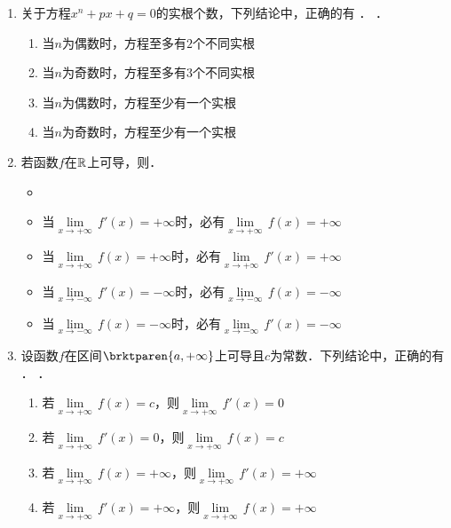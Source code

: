 \begin{enumerate}
\item 关于方程\(x^n + px + q = 0\)的实根个数，下列结论中，正确的有\ifshowsol
  \uline{}．
  \else
  \uline{\hspace{6em}}．
  \fi
  \begin{enumerate}
    \renewcommand{\labelenumii}{\enumparen{\arabic{enumii}}}
  \item 当\(n\)为偶数时，方程至多有\(2\)个不同实根
  \item 当\(n\)为奇数时，方程至多有\(3\)个不同实根
  \item 当\(n\)为偶数时，方程至少有一个实根
  \item 当\(n\)为奇数时，方程至少有一个实根
  \end{enumerate}

\item 若函数\(f\)在\(\mathbb{R}\)上可导，则\uline{\hspace{10em}}．
  \begin{itemize}
    \renewcommand{\labelitemi}{\faCircleThin}
    \ifshowsol
  \item[\faCircle]
    \else
  \item
    \fi
    当\(\!\lim\limits_{x\to+\infty}\,f'(x) = +\infty\)时，必有\(\!\lim\limits_{x\to+\infty}\,f(x) = +\infty\)
  \item 当\(\!\lim\limits_{x\to+\infty}\,f(x) = +\infty\)时，必有\(\!\lim\limits_{x\to+\infty}\,f'(x) = +\infty\)
  \item 当\(\!\lim\limits_{x\to-\infty}\,f'(x) = -\infty\)时，必有\(\!\lim\limits_{x\to-\infty}\,f(x) = -\infty\)
  \item 当\(\!\lim\limits_{x\to-\infty}\,f(x) = -\infty\)时，必有\(\!\lim\limits_{x\to-\infty}\,f'(x) = -\infty\)
  \end{itemize}

\item 设函数\(f\)在区间\(\brktparen{a,+\infty}\)上可导且\(c\)为常数．下列结论中，正确的有\ifshowsol
  \uline{}．
  \else
  \uline{\hspace{6em}}．
  \fi
  \begin{enumerate}
    \renewcommand{\labelenumii}{\enumparen{\arabic{enumii}}}
  \item 若\(\!\lim\limits_{x\to+\infty}\,f(x) = c\)，则\(\!\lim\limits_{x\to+\infty}\,f'(x) = 0\)
  \item 若\(\!\lim\limits_{x\to+\infty}\,f'(x) = 0\)，则\(\!\lim\limits_{x\to+\infty}\,f(x) = c\)
  \item 若\(\!\lim\limits_{x\to+\infty}\,f(x) = +\infty\)，则\(\!\lim\limits_{x\to+\infty}\,f'(x) = +\infty\)
  \item 若\(\!\lim\limits_{x\to+\infty}\,f'(x) = +\infty\)，则\(\!\lim\limits_{x\to+\infty}\,f(x) = +\infty\)
  \end{enumerate}


\end{enumerate}
